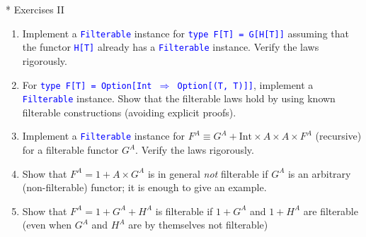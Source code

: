 \documentclass[english]{beamer}
\begin{document}
\begin{frame}{{*} Exercises II}
\begin{enumerate}
\item Implement a \texttt{\textcolor{blue}{\footnotesize{}Filterable}} instance
for \texttt{\textcolor{blue}{\footnotesize{}type F{[}T{]} = G{[}H{[}T{]}{]}}}
assuming that the functor \texttt{\textcolor{blue}{\footnotesize{}H{[}T{]}}}
already has a \texttt{\textcolor{blue}{\footnotesize{}Filterable}}
instance. Verify the laws rigorously.
\item For \texttt{\textcolor{blue}{\footnotesize{}type F{[}T{]} = Option{[}Int
$\Rightarrow$ Option{[}(T, T){]}{]}}}, implement a \texttt{\textcolor{blue}{\footnotesize{}Filterable}}
instance. Show that the filterable laws hold by using known filterable
constructions (avoiding explicit proofs).
\item Implement a \texttt{\textcolor{blue}{\footnotesize{}Filterable}} instance
for $F^{A}\equiv G^{A}+\text{Int}\times A\times A\times F^{A}$ (recursive)
for a filterable functor $G^{A}$. Verify the laws rigorously.
\item Show that $F^{A}=1+A\times G^{A}$ is in general \emph{not} filterable
if $G^{A}$ is an arbitrary (non-filterable) functor; it is enough
to give an example.
\item Show that $F^{A}=1+G^{A}+H^{A}$ is filterable if $1+G^{A}$ and $1+H^{A}$
are filterable (even when $G^{A}$ and $H^{A}$ are by themselves
not filterable)
\end{enumerate}
\end{frame}
\end{document}
